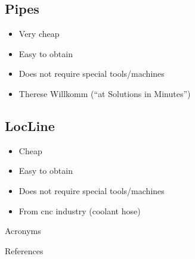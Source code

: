 \documentclass[aspectratio=169]{beamer}
\begin{document}
\begin{frame}
\end{frame}

\subsection{ Pipes}

\begin{frame}
    \begin{itemize}
        \item Very cheap
        \item Easy to obtain
        \item Does not require special tools/machines
        \item Therese Willkomm (``\acs{at} Solutions in Minutes'')
    \end{itemize}
\end{frame}

\begin{frame}
\end{frame}

\subsection{LocLine}

\begin{frame}
    \begin{itemize}
        \item Cheap
        \item Easy to obtain
        \item Does not require special tools/machines
        \item From \acs{cnc} industry (coolant hose)
    \end{itemize}
\end{frame}

\appendix

\begin{frame}[allowframebreaks]{Acronyms}
    \printglossary[type=\acronymtype, nonumberlist]
\end{frame}

\begin{frame}[allowframebreaks]{References}
    
\end{frame}
\end{document}
